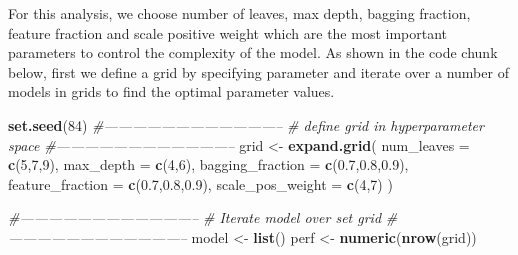 \documentclass[11pt,oneside,a4paper]{reedthesis}
\newenvironment{Shaded}{\begin{snugshade}}{\end{snugshade}}
\newcommand{\KeywordTok}[1]{\textcolor[rgb]{0.13,0.29,0.53}{\textbf{#1}}}
\newcommand{\DataTypeTok}[1]{\textcolor[rgb]{0.13,0.29,0.53}{#1}}
\newcommand{\DecValTok}[1]{\textcolor[rgb]{0.00,0.00,0.81}{#1}}
\newcommand{\FloatTok}[1]{\textcolor[rgb]{0.00,0.00,0.81}{#1}}
\newcommand{\StringTok}[1]{\textcolor[rgb]{0.31,0.60,0.02}{#1}}
\newcommand{\CommentTok}[1]{\textcolor[rgb]{0.56,0.35,0.01}{\textit{#1}}}
\newcommand{\NormalTok}[1]{#1}
\begin{document}
For this analysis, we choose number of leaves, max depth, bagging
fraction, feature fraction and scale positive weight which are the most
important parameters to control the complexity of the model. As shown in
the code chunk below, first we define a grid by specifying parameter and
iterate over a number of models in grids to find the optimal parameter
values.
\begin{Shaded}
\begin{Highlighting}[]
\KeywordTok{set.seed}\NormalTok{(}\DecValTok{84}\NormalTok{)}
\CommentTok{#--------------------------------------}
\CommentTok{# define grid in hyperparameter space}
\CommentTok{#--------------------------------------}
\NormalTok{grid <-}\StringTok{ }\KeywordTok{expand.grid}\NormalTok{(}
  \DataTypeTok{num_leaves        =} \KeywordTok{c}\NormalTok{(}\DecValTok{5}\NormalTok{,}\DecValTok{7}\NormalTok{,}\DecValTok{9}\NormalTok{),}
  \DataTypeTok{max_depth         =} \KeywordTok{c}\NormalTok{(}\DecValTok{4}\NormalTok{,}\DecValTok{6}\NormalTok{),}
  \DataTypeTok{bagging_fraction  =} \KeywordTok{c}\NormalTok{(}\FloatTok{0.7}\NormalTok{,}\FloatTok{0.8}\NormalTok{,}\FloatTok{0.9}\NormalTok{),}
  \DataTypeTok{feature_fraction  =} \KeywordTok{c}\NormalTok{(}\FloatTok{0.7}\NormalTok{,}\FloatTok{0.8}\NormalTok{,}\FloatTok{0.9}\NormalTok{),}
  \DataTypeTok{scale_pos_weight  =} \KeywordTok{c}\NormalTok{(}\DecValTok{4}\NormalTok{,}\DecValTok{7}\NormalTok{) }
\NormalTok{)}

\CommentTok{#--------------------------------------}
\CommentTok{# Iterate model over set grid}
\CommentTok{#--------------------------------------}
\NormalTok{model <-}\StringTok{ }\KeywordTok{list}\NormalTok{()}
\NormalTok{perf <-}\StringTok{ }\KeywordTok{numeric}\NormalTok{(}\KeywordTok{nrow}\NormalTok{(grid))}


\end{Highlighting}
\end{Shaded}
\end{document}

